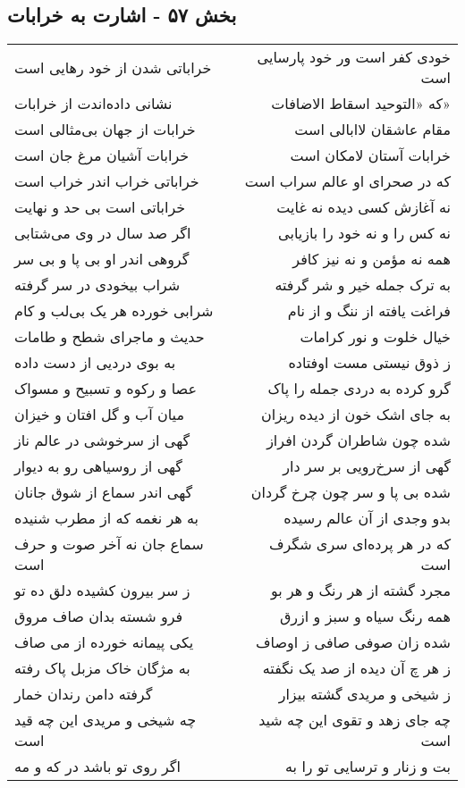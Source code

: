 \begin{center}
\section*{بخش ۵۷ - اشارت به خرابات}
\label{sec:sh057}
\begin{longtable}{l p{0.5cm} r}
خراباتی شدن از خود رهایی است
&&
خودی کفر است ور خود پارسایی است
\\
نشانی داده‌اندت از خرابات
&&
که «التوحید اسقاط الاضافات»
\\
خرابات از جهان بی‌مثالی است
&&
مقام عاشقان لاابالی است
\\
خرابات آشیان مرغ جان است
&&
خرابات آستان لامکان است
\\
خراباتی خراب اندر خراب است
&&
که در صحرای او عالم سراب است
\\
خراباتی است بی حد و نهایت
&&
نه آغازش کسی دیده نه غایت
\\
اگر صد سال در وی می‌شتابی
&&
نه کس را و نه خود را بازیابی
\\
گروهی اندر او بی پا و بی سر
&&
همه نه مؤمن و نه نیز کافر
\\
شراب بیخودی در سر گرفته
&&
به ترک جمله خیر و شر گرفته
\\
شرابی خورده هر یک بی‌لب و کام
&&
فراغت یافته از ننگ و از نام
\\
حدیث و ماجرای شطح و طامات
&&
خیال خلوت و نور کرامات
\\
به بوی دردیی از دست داده
&&
ز ذوق نیستی مست اوفتاده
\\
عصا و رکوه و تسبیح و مسواک
&&
گرو کرده به دردی جمله را پاک
\\
میان آب و گل افتان و خیزان
&&
به جای اشک خون از دیده ریزان
\\
گهی از سرخوشی در عالم ناز
&&
شده چون شاطران گردن افراز
\\
گهی از روسیاهی رو به دیوار
&&
گهی از سرخ‌رویی بر سر دار
\\
گهی اندر سماع از شوق جانان
&&
شده بی پا و سر چون چرخ گردان
\\
به هر نغمه که از مطرب شنیده
&&
بدو وجدی از آن عالم رسیده
\\
سماع جان نه آخر صوت و حرف است
&&
که در هر پرده‌ای سری شگرف است
\\
ز سر بیرون کشیده دلق ده تو
&&
مجرد گشته از هر رنگ و هر بو
\\
فرو شسته بدان صاف مروق
&&
همه رنگ سیاه و سبز و ازرق
\\
یکی پیمانه خورده از می صاف
&&
شده زان صوفی صافی ز اوصاف
\\
به مژگان خاک مزبل پاک رفته
&&
ز هر چ آن دیده از صد یک نگفته
\\
گرفته دامن رندان خمار
&&
ز شیخی و مریدی گشته بیزار
\\
چه شیخی و مریدی این چه قید است
&&
چه جای زهد و تقوی این چه شید است
\\
اگر روی تو باشد در که و مه
&&
بت و زنار و ترسایی تو را به
\\
\end{longtable}
\end{center}
